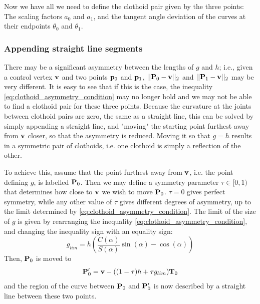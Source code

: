 Now we have all we need to define the clothoid pair given by the three points: The scaling factors $a_0$ and $a_1$, and the tangent angle deviation of the curves at their endpoints $\theta_0$ and $\theta_1$.

\subsubsection{Appending straight line segments}
There may be a significant asymmetry between the lengths of $g$ and $h$; i.e., given a control vertex $\mathbf{v}$ and two points $\mathbf{p}_0$ and $\mathbf{p}_1$, $||{\mathbf P}_0-\mathbf{v}||_2$ and $||{\mathbf P}_1-\mathbf{v}||_2$ may be very different. It is easy to see that if this is the case, the inequality \ref{eq:clothoid_asymmetry_condition} may no longer hold and we may not be able to find a clothoid pair for these three points. Because the curvature at the joints between clothoid pairs are zero, the same as a straight line, this can be solved by simply appending a straight line, and "moving" the starting point furthest away from ${\mathbf v}$ closer, so that the asymmetry is reduced. Moving it so that $g=h$ results in a symmetric pair of clothoids, i.e. one clothoid is simply a reflection of the other.\cite{clothoid}

To achieve this, assume that the point furthest away from ${\mathbf v}$, i.e. the point defining $g$, is labelled ${\mathbf P}_0$. Then we may define a symmetry parameter $\tau\in [0, 1)$ that determines how close to ${\mathbf v}$ we wish to move ${\mathbf P}_0$. $\tau=0$ gives perfect symmetry, while any other value of $\tau$ gives different degrees of asymmetry, up to the limit determined by \ref{eq:clothoid_asymmetry_condition}. The limit of the size of $g$ is given by rearranging the inequality \ref{eq:clothoid_asymmetry_condition}, and changing the inequality sign with an equality sign:
\begin{equation}
g_{lim} = h\left(\frac{C(\alpha)}{S(\alpha)}\sin(\alpha) - \cos(\alpha)\right)
\end{equation}
Then, ${\mathbf P}_0$ is moved to 
\begin{equation}
{\mathbf P}_0^\prime = {\mathbf v}-((1-\tau)h + \tau g_{lim}){\mathbf T}_0
\end{equation}
and the region of the curve between ${\mathbf P}_0$ and ${\mathbf P}_0^\prime$ is now described by a straight line between these two points. 


